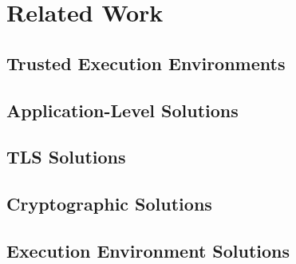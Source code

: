 \section{Related Work}
\label{sec:related}


\subsection{Trusted Execution Environments}






\subsection{Application-Level Solutions}


\subsection{TLS Solutions}


\subsection{Cryptographic Solutions}


\subsection{Execution Environment Solutions}




%
